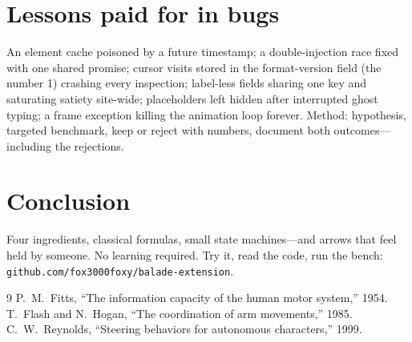 \documentclass[10pt,conference]{IEEEtran}
\begin{document}
\section{Lessons paid for in bugs}
An element cache poisoned by a future timestamp; a double-injection race
fixed with one shared promise; cursor visits stored in the format-version
field (the number 1) crashing every inspection; label-less fields sharing one
key and saturating satiety site-wide; placeholders left hidden after
interrupted ghost typing; a frame exception killing the animation loop
forever. Method: hypothesis, targeted benchmark, keep or reject with numbers,
document both outcomes---including the rejections.

\section{Conclusion}
Four ingredients, classical formulas, small state machines---and arrows that
feel held by someone. No learning required. Try it, read the code, run the
bench: \texttt{github.com/fox3000foxy/balade-extension}.
\begin{thebibliography}{9}
 P.~M.~Fitts, ``The information capacity of the human motor system,'' 1954.
 T.~Flash and N.~Hogan, ``The coordination of arm movements,'' 1985.
 C.~W.~Reynolds, ``Steering behaviors for autonomous characters,'' 1999.
\end{thebibliography}
\end{document}
